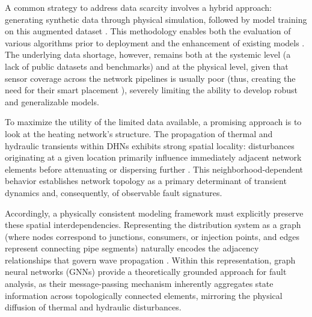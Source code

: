\documentclass[energies,article,submit,pdftex,moreauthors]{Definitions/mdpi}
\begin{document}

A common strategy to address data scarcity involves a hybrid approach:
generating synthetic data through physical simulation, followed by model
training on this augmented dataset \cite{boussaid2024enabling}. This
methodology enables both the evaluation of various algorithms prior to
deployment and the enhancement of existing models \cite{vallee2023generation}.
The underlying data shortage, however, remains both at the systemic level (a
lack of public datasets and benchmarks) and at the physical level, given that
sensor coverage across the network pipelines is usually poor (thus, creating
the need for their smart placement \cite{rosich2012optimal,
	novitsky2023actual}), severely limiting the ability to develop robust and
generalizable models.


To maximize the utility of the limited data available, a promising approach is
to look at the heating network's structure. The propagation of thermal and
hydraulic transients within DHNs exhibits strong spatial locality: disturbances
originating at a given location primarily influence immediately adjacent
network elements before attenuating or dispersing further
\cite{sarbu2019review}. This neighborhood-dependent behavior establishes
network topology as a primary determinant of transient dynamics and,
consequently, of observable fault signatures.


Accordingly, a physically consistent modeling framework must explicitly
preserve these spatial interdependencies. Representing the distribution system
as a graph (where nodes correspond to junctions, consumers, or injection
points, and edges represent connecting pipe segments) naturally encodes the
adjacency relationships that govern wave propagation \cite{dorfner2014large}.
Within this representation, graph neural networks (GNNs) provide a
theoretically grounded approach for fault analysis, as their message-passing
mechanism inherently aggregates state information across topologically
connected elements, mirroring the physical diffusion of thermal and hydraulic
disturbances.

\end{document}

